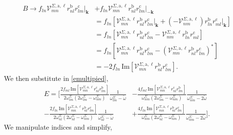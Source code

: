 \documentclass[letterpaper,aps]{revtex4}
\begin{document}
\begin{align*}
B \rightarrow f_{ln}\mathcal{V}^{\Sigma,\text{a},\ell}_{mn}
    r^{\text{b}}_{nl}r^{\text{c}}_{lm}\vert_{\mathbf{k}}
&+  f_{ln}\mathcal{V}^{\Sigma,\text{a},\ell}_{mn}r^{\text{b}}_{nl}
    r^{\text{c}}_{lm}\vert_{-\mathbf{k}}\nonumber\\
&=  f_{ln}\left[\mathcal{V}^{\Sigma,\text{a},\ell}_{mn}
    r^{\text{b}}_{nl}r^{\text{c}}_{lm}\vert_{\mathbf{k}} 
+   \left(-\mathcal{V}^{\Sigma,\text{a},\ell}_{nm}\right)
    r^{\text{b}}_{ln}r^{\text{c}}_{ml}\vert_{\mathbf{k}}\right]\nonumber\\
&=  f_{ln}\left[\mathcal{V}^{\Sigma,\text{a},\ell}_{mn}
    r^{\text{b}}_{nl}r^{\text{c}}_{lm} 
-   \mathcal{V}^{\Sigma,\text{a},\ell}_{nm}
    r^{\text{b}}_{ln}r^{\text{c}}_{ml}\right]\nonumber\\
&=  f_{ln}\left[\mathcal{V}^{\Sigma,\text{a},\ell}_{mn}
    r^{\text{b}}_{nl}r^{\text{c}}_{lm}
-   \left(\mathcal{V}^{\Sigma,\text{a},\ell}_{mn}
    r^{\text{b}}_{nl}r^{\text{c}}_{lm}\right)^*\right]\nonumber\\
&= -2f_{ln}\,\mathrm{Im}\left[\mathcal{V}^{\Sigma,\text{a},\ell}_{mn}
    r^{\text{b}}_{nl}r^{\text{c}}_{lm}\right]
.
\end{align*}
We then substitute in \eqref{emultipied},
\begin{align*}
E =  
\Bigg[
  \frac{2f_{ml}\,\mathrm{Im}\left[\mathcal{V}^{\Sigma,\text{a},\ell}_{mn}
        r^{\text{c}}_{nl}
        r^{\text{b}}_{lm}\right]}
        {2\omega^\Sigma_{lm}(2\omega^\Sigma_{lm}-\omega^\Sigma_{nm})}
\frac{1}{\omega^\Sigma_{lm}-\tilde\omega}
&-\frac{4f_{ml}\,\mathrm{Im}\left[\mathcal{V}^{\Sigma,\text{a},\ell}_{mn}
        r^{\text{c}}_{nl}
        r^{\text{b}}_{lm}\right]}
        {\omega^\Sigma_{nm}(2\omega^\Sigma_{lm}-\omega^\Sigma_{nm})}
\frac{1}{\omega^\Sigma_{nm}-2\tilde\omega}\nonumber\\
-\frac{2f_{ln}\,\mathrm{Im}\left[\mathcal{V}^{\Sigma,\text{a},\ell}_{mn}
        r^{\text{b}}_{nl}
        r^{\text{c}}_{lm}\right]}
        {2\omega^\Sigma_{nl}(2\omega^\Sigma_{nl}-\omega^\Sigma_{nm})}
\frac{1}{\omega^\Sigma_{nl}-\tilde\omega}
&+\frac{4f_{ln}\,\mathrm{Im}\left[\mathcal{V}^{\Sigma,\text{a},\ell}_{mn}
        r^{\text{b}}_{nl}
        r^{\text{c}}_{lm}\right]}
        {\omega^\Sigma_{nm}(2\omega^\Sigma_{nl}-\omega^\Sigma_{nm})}
\frac{1}{\omega^\Sigma_{nm}-2\tilde\omega}
\Bigg]
.
\end{align*}
We manipulate indices and simplify,
\end{document}
